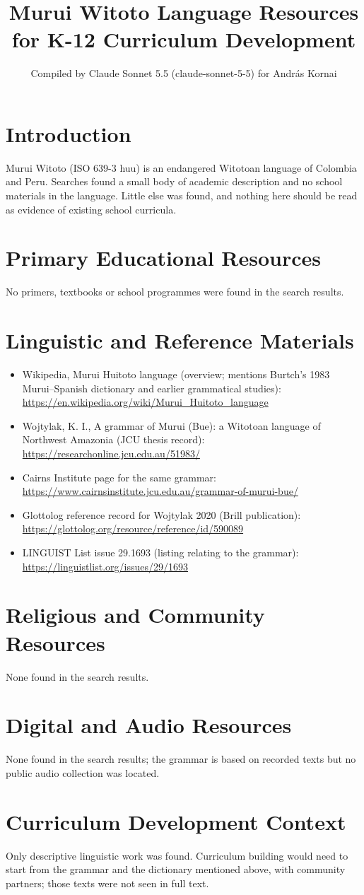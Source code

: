 \documentclass[12pt]{article}
\title{Murui Witoto Language Resources for K-12 Curriculum Development}
\author{Compiled by Claude Sonnet 5.5 (claude-sonnet-5-5) for Andr\'as Kornai}
\date{}
\begin{document}
\maketitle
\section{Introduction}
Murui Witoto (ISO 639-3 huu) is an endangered Witotoan language of Colombia and Peru. Searches found a small body of academic description and no school materials in the language. Little else was found, and nothing here should be read as evidence of existing school curricula.
\section{Primary Educational Resources}
No primers, textbooks or school programmes were found in the search results.
\section{Linguistic and Reference Materials}
\begin{itemize}
\item Wikipedia, Murui Huitoto language (overview; mentions Burtch's 1983 Murui--Spanish dictionary and earlier grammatical studies): \url{https://en.wikipedia.org/wiki/Murui_Huitoto_language}
\item Wojtylak, K. I., A grammar of Murui (Bue): a Witotoan language of Northwest Amazonia (JCU thesis record): \url{https://researchonline.jcu.edu.au/51983/}
\item Cairns Institute page for the same grammar: \url{https://www.cairnsinstitute.jcu.edu.au/grammar-of-murui-bue/}
\item Glottolog reference record for Wojtylak 2020 (Brill publication): \url{https://glottolog.org/resource/reference/id/590089}
\item LINGUIST List issue 29.1693 (listing relating to the grammar): \url{https://linguistlist.org/issues/29/1693}
\end{itemize}
\section{Religious and Community Resources}
None found in the search results.
\section{Digital and Audio Resources}
None found in the search results; the grammar is based on recorded texts but no public audio collection was located.
\section{Curriculum Development Context}
Only descriptive linguistic work was found. Curriculum building would need to start from the grammar and the dictionary mentioned above, with community partners; those texts were not seen in full text.
\end{document}
